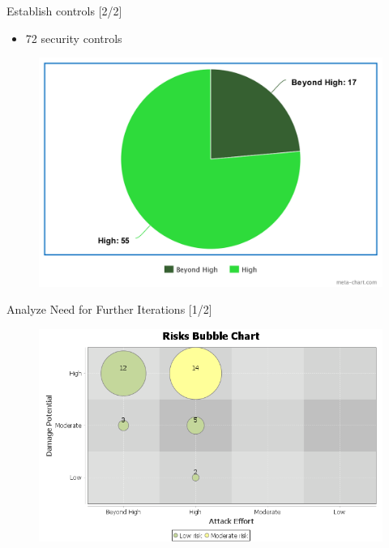 \documentclass[xcolor=table]{beamer}
\begin{document}
\begin{frame}{Establish controls [2/2]}
\begin{itemize}
    \item 72 security controls
\end{itemize}
 \begin{figure}[H]
  \includegraphics[width=\linewidth]{img/controls.png}
  \label{fig:controlchart}
\end{figure}
\end{frame}


\begin{frame}{Analyze Need for Further Iterations [1/2]}

 \begin{figure}[H]
  \includegraphics[width=\linewidth]{img/bubble_p2.png}
  \label{fig:bubblechart2}
\end{figure}
\end{frame}
\end{document}
